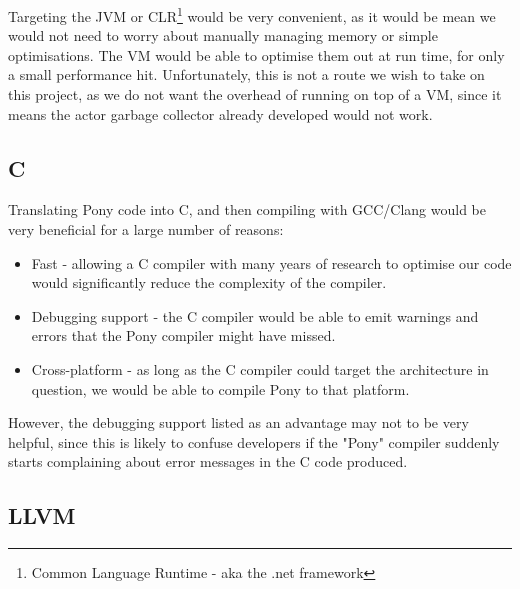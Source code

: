 \documentclass[11pt,a4paper]{report}
\begin{document}
Targeting the JVM or CLR\footnote{Common Language Runtime - aka the .net framework} would be very convenient, as it would be mean we would not need to worry about manually managing memory or simple optimisations. 
The VM would be able to optimise them out at run time, for only a small performance hit.
Unfortunately, this is not a route we wish to take on this project, as we do not want the overhead of running on top of a VM, since it means the actor garbage collector already developed would not work.

\subsection{C}

Translating Pony code into C, and then compiling with GCC/Clang would be very beneficial for a large number of reasons:
\begin{itemize}[noitemsep]
	\item Fast - allowing a C compiler with many years of research to optimise our code would significantly reduce the complexity of the compiler.
	\item Debugging support - the C compiler would be able to emit warnings and errors that the Pony compiler might have missed.
	\item Cross-platform - as long as the C compiler could target the architecture in question, we would be able to compile Pony to that platform.
\end{itemize}

However, the debugging support listed as an advantage may not to be very helpful, since this is likely to confuse developers if the "Pony" compiler suddenly starts complaining about error messages in the C code produced.

\subsection{LLVM}
\end{document}
